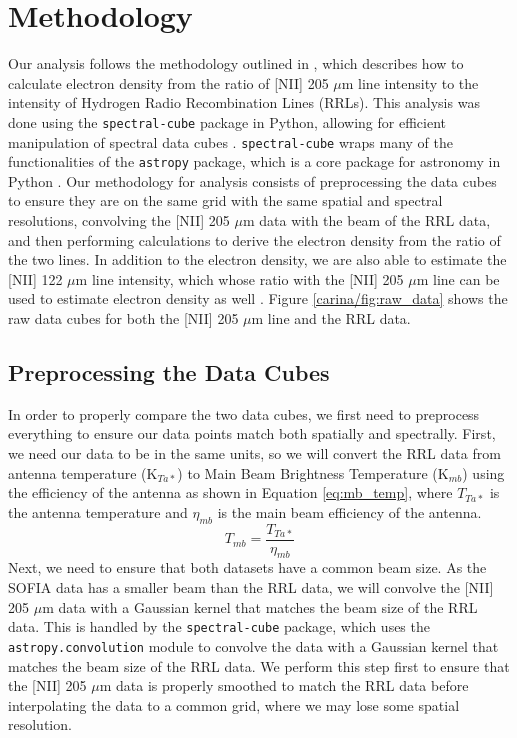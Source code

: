 \section{Methodology}
Our analysis follows the methodology outlined in \cite{pineda2019electron}, which describes how to calculate electron density from the ratio of [NII] 205 $\mu$m line intensity to the intensity of Hydrogen Radio Recombination Lines (RRLs).
This analysis was done using the \texttt{spectral-cube} package in Python, allowing for efficient manipulation of spectral data cubes \parencite{robitaille2016spectral}.
\texttt{spectral-cube} wraps many of the functionalities of the \texttt{astropy} package, which is a core package for astronomy in Python \parencite{astropy:2013, astropy:2018, astropy:2022}.
Our methodology for analysis consists of preprocessing the data cubes to ensure they are on the same grid with the same spatial and spectral resolutions, convolving the [NII] 205 $\mu$m data with the beam of the RRL data, and then performing calculations to derive the electron density from the ratio of the two lines.
In addition to the electron density, we are also able to estimate the [NII] 122 $\mu$m line intensity, which whose ratio with the [NII] 205 $\mu$m line can be used to estimate electron density as well \parencite{goldsmith2015herschel}.
Figure \ref{carina/fig:raw_data} shows the raw data cubes for both the [NII] 205 $\mu$m line and the RRL data.

\subsection{Preprocessing the Data Cubes}
In order to properly compare the two data cubes, we first need to preprocess everything to ensure our data points match both spatially and spectrally.
First, we need our data to be in the same units, so we will convert the RRL data from antenna temperature (K$_{Ta*}$) to Main Beam Brightness Temperature (K$_{mb}$) using the efficiency of the antenna as shown in Equation \ref{eq:mb_temp}, where $T_{Ta*}$ is the antenna temperature and $\eta_{mb}$ is the main beam efficiency of the antenna.
\begin{equation}
    T_{mb} = \frac{T_{Ta*}}{\eta_{mb}}
    \label{eq:mb_temp}
\end{equation}
Next, we need to ensure that both datasets have a common beam size.
As the SOFIA data has a smaller beam than the RRL data, we will convolve the [NII] 205 $\mu$m data with a Gaussian kernel that matches the beam size of the RRL data.
This is handled by the \texttt{spectral-cube} package, which uses the \texttt{astropy.convolution} module to convolve the data with a Gaussian kernel that matches the beam size of the RRL data.
We perform this step first to ensure that the [NII] 205 $\mu$m data is properly smoothed to match the RRL data before interpolating the data to a common grid, where we may lose some spatial resolution. 

